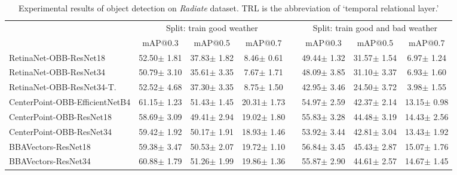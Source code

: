 \documentclass[10pt,twocolumn,letterpaper]{article}
\begin{document}
\begin{table*}
  \caption{Experimental results of object detection on \textit{Radiate} dataset. TRL is the abbreviation of `temporal relational layer.'}\vspace{-3mm}
  \label{tab:det}
  \centering
  \setlength\tabcolsep{6.5pt}
  {
  \begin{tabular}{lccccccc}
    \toprule
    
    & \multicolumn{3}{c}{Split: train good weather} & & \multicolumn{3}{c}{Split: train good and bad weather} \\
    \cmidrule{2-4}\cmidrule{6-8}
    & mAP@0.3 & mAP@0.5 & mAP@0.7 & & mAP@0.3 & mAP@0.5 & mAP@0.7 \\
    
    \midrule
    
    RetinaNet-OBB-ResNet18 & 52.50\scriptsize{$\pm$ 1.81} & 37.83\scriptsize{$\pm$ 1.82} & 8.46\scriptsize{$\pm$ 0.61} & & 49.44\scriptsize{$\pm$ 1.32} & 31.57\scriptsize{$\pm$ 1.54} & 6.97\scriptsize{$\pm$ 1.24} \\
    RetinaNet-OBB-ResNet34 & 50.79\scriptsize{$\pm$ 3.10} & 35.61\scriptsize{$\pm$ 3.35} & 7.67\scriptsize{$\pm$ 1.71} & & 48.09\scriptsize{$\pm$ 3.85} & 31.10\scriptsize{$\pm$ 3.37} & 6.93\scriptsize{$\pm$ 1.60} \\
    RetinaNet-OBB-ResNet34-T. & 52.52\scriptsize{$\pm$ 4.68} & 37.30\scriptsize{$\pm$ 3.35} & 8.75\scriptsize{$\pm$ 1.50} & & 42.95\scriptsize{$\pm$ 3.46} & 24.50\scriptsize{$\pm$ 3.72} & 3.98\scriptsize{$\pm$ 1.55} \\
    CenterPoint-OBB-EfficientNetB4 & 61.15\scriptsize{$\pm$ 1.23} & 51.43\scriptsize{$\pm$ 1.45} & 20.31\scriptsize{$\pm$ 1.73} & & 54.97\scriptsize{$\pm$ 2.59} & 42.37\scriptsize{$\pm$ 2.14} & 13.15\scriptsize{$\pm$ 0.98} \\
    CenterPoint-OBB-ResNet18 & 58.69\scriptsize{$\pm$ 3.09} & 49.41\scriptsize{$\pm$ 2.94} & 19.02\scriptsize{$\pm$ 1.80} & & 55.83\scriptsize{$\pm$ 3.28} & 44.48\scriptsize{$\pm$ 3.19} & 14.43\scriptsize{$\pm$ 2.56} \\
    CenterPoint-OBB-ResNet34 & 59.42\scriptsize{$\pm$ 1.92} & 50.17\scriptsize{$\pm$ 1.91} & 18.93\scriptsize{$\pm$ 1.46} & & 53.92\scriptsize{$\pm$ 3.44} & 42.81\scriptsize{$\pm$ 3.04} & 13.43\scriptsize{$\pm$ 1.92} \\
    BBAVectors-ResNet18 & 59.38\scriptsize{$\pm$ 3.47} & 50.53\scriptsize{$\pm$ 2.07} & 19.72\scriptsize{$\pm$ 1.10} & & 56.84\scriptsize{$\pm$ 3.45} & 45.43\scriptsize{$\pm$ 2.87} & 15.07\scriptsize{$\pm$ 1.76} \\
    BBAVectors-ResNet34 & 60.88\scriptsize{$\pm$ 1.79} & 51.26\scriptsize{$\pm$ 1.99} & 19.86\scriptsize{$\pm$ 1.36} & & 55.87\scriptsize{$\pm$ 2.90} & 44.61\scriptsize{$\pm$ 2.57} & 14.67\scriptsize{$\pm$ 1.45} \\
    

\end{tabular}}
\end{table*}
\end{document}
